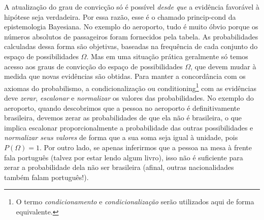 \documentclass[./main.tex]{subfiles}
\begin{document}
\par A atualização do grau de convicção só é possível \textit{desde que} a evidência favorável à hipótese seja verdadeira. Por essa razão, esse é o chamado \gls{princip-cond} da epistemologia Bayesiana. No exemplo do aeroporto, tudo é muito óbvio porque os números absolutos de passageiros foram fornecidos pela tabela. As probabilidades calculadas dessa forma são objetivas, baseadas na frequência de cada conjunto do espaço de possibilidades $\Omega$. Mas em uma situação prática geralmente só temos acesso aos graus de convicção do espaço de possibilidades $\Omega$, que devem mudar à medida que novas evidências são obtidas. Para manter a concordância com os axiomas do probabilismo, a condicionalização ou \gls{conditioning}\footnote{O termo \textit{condicionamento} e \textit{condicionalização} serão utilizados aqui de forma equivalente.} com as evidências deve \textit{zerar}, \textit{escalonar} e \textit{normalizar} os valores das probabilidades. No exemplo do aeroporto, quando descobrimos que a pessoa no aeroporto é definitivamente brasileira, devemos zerar as probabilidades de que ela não é brasileira, o que implica escalonar proporcionalmente a probabilidade das outras possibilidades e \textit{normalizar seus valores} de forma que a sua soma seja igual à unidade, pois $P(\Omega) = 1$. Por outro lado, se apenas inferirmos que a pessoa na mesa à frente fala português (talvez por estar lendo algum livro), isso não é suficiente para zerar a probabilidade dela não ser brasileira (afinal, outras nacionalidades também falam português!).
\end{document}
